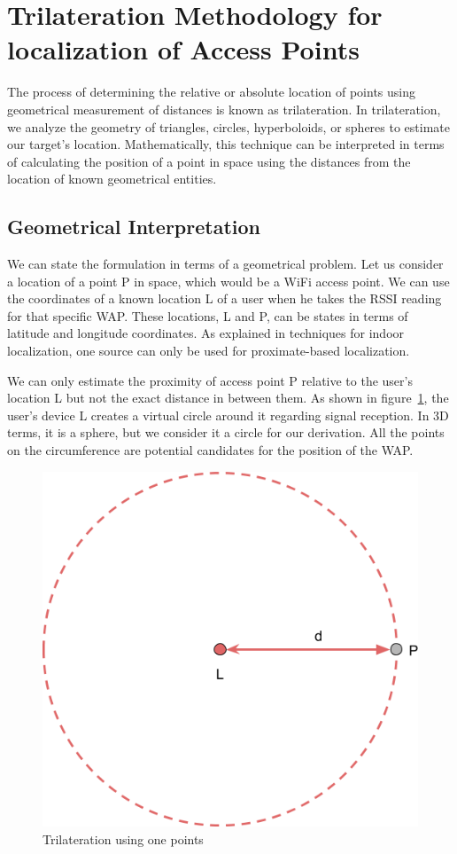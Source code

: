 \documentclass[a4paper,singleside,12pt]{report} %
\begin{document}
\newpage


		\section{Trilateration Methodology for localization of Access Points}

			The process of determining the relative or absolute location of points using geometrical measurement of distances is known as trilateration. 
			In trilateration, we analyze the geometry of triangles, circles, hyperboloids, or spheres to estimate our target's location. 
			Mathematically, this technique can be interpreted in terms of calculating the position of a point in space using the distances from the location of known geometrical entities.

			\subsection{Geometrical Interpretation}
				We can state the formulation in terms of a geometrical problem. 
				Let us consider a location of a point P in space, which would be a WiFi access point. 
				We can use the coordinates of a known location L of a user when he takes the RSSI reading for that specific WAP. 
				These locations, L and P, can be states in terms of latitude and longitude coordinates. 
				As explained in techniques for indoor localization, one source can only be used for proximate-based localization. 

				We can only estimate the proximity of access point P relative to the user's location L but not the exact distance in between them. 
				As shown in figure~\ref{fig4.12}, the user's device L creates a virtual circle around it regarding signal reception. 
				In 3D terms, it is a sphere, but we consider it a circle for our derivation. All the points on the circumference are potential candidates for the position of the WAP.

				\begin{figure}[htb!]
					\centering
					\includegraphics[width=0.35\linewidth]{./figures/Trilateration1.png}
					\caption{Trilateration using one points}
					 \label{fig4.12}
				\end{figure}
				
\end{document}
